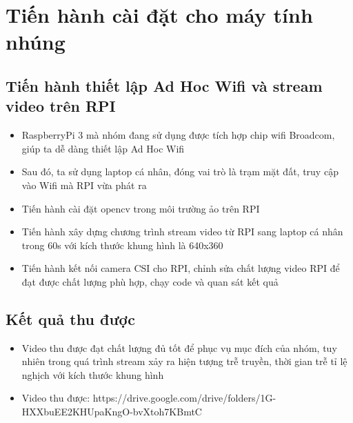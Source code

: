 \documentclass[12pt,a4paper]{report}
\begin{document}
\section{Tiến hành cài đặt cho máy tính nhúng}
\subsection{Tiến hành thiết lập Ad Hoc Wifi và stream video trên RPI }
\begin{itemize}
	\item RaspberryPi 3 mà nhóm đang sử dụng được tích hợp chip wifi Broadcom, giúp ta dễ dàng thiết lập Ad Hoc Wifi
	\item Sau đó, ta sử dụng laptop cá nhân, đóng vai trò là trạm mặt đất, truy cập vào Wifi mà RPI vừa phát ra 
	\item Tiến hành cài đặt opencv trong môi trường ảo trên RPI
	\item Tiến hành xây dựng chương trình stream video từ RPI sang laptop cá nhân trong 60s với kích thước khung hình là 640x360
	\item Tiến hành kết nối camera CSI cho RPI, chỉnh sửa chất lượng video RPI để đạt được chất lượng phù hợp, chạy code và quan sát kết quả
\end{itemize}
\subsection{Kết quả thu được}
\begin{itemize}
	\item Video thu được đạt chất lượng đủ tốt để phục vụ mục đích của nhóm, tuy nhiên trong quá trình stream xảy ra hiện tượng trễ truyền, thời gian trễ tỉ lệ nghịch với kích thước khung hình
	\item Video thu được: https://drive.google.com/drive/folders/1G-HXXbuEE2KHUpaKngO-bvXtoh7KBmtC
		
\end{itemize}
\end{document}

